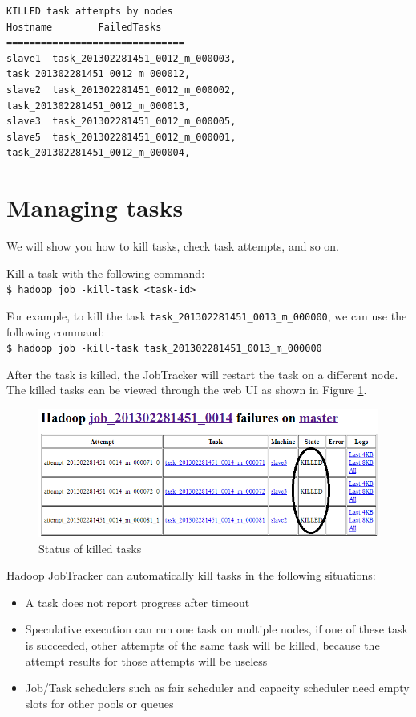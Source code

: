 \begin{lstlisting}
KILLED task attempts by nodes
Hostname        FailedTasks
===============================
slave1  task_201302281451_0012_m_000003, task_201302281451_0012_m_000012,
slave2  task_201302281451_0012_m_000002, task_201302281451_0012_m_000013,
slave3  task_201302281451_0012_m_000005,
slave5  task_201302281451_0012_m_000001, task_201302281451_0012_m_000004,
\end{lstlisting}

\section{Managing tasks}
We will show you how to kill tasks, check task attempts, and so on. 

Kill a task with the following command: \\
\verb|$ hadoop job -kill-task <task-id> |

For example, to kill the task \verb|task_201302281451_0013_m_000000|, we can use the following command: \\ 
\verb|$ hadoop job -kill-task task_201302281451_0013_m_000000|

After the task is killed, the JobTracker will restart the task on a different node. The killed tasks can be viewed through the web UI as shown in Figure \ref{fig:mapred.killed.tasks}.
\begin{figure}[ht]
  \centering
  \includegraphics[width=\textwidth]{figs/5163os_04_14.png}
  \caption{Status of killed tasks}\label{fig:mapred.killed.tasks}
\end{figure} 
Hadoop JobTracker can automatically kill tasks in the following situations:
\begin{itemize}
  \item A task does not report progress after timeout
  \item Speculative execution can run one task on multiple nodes, if one of these task is succeeded, other attempts of the same task will be killed, because the attempt results for those attempts will be useless
  \item Job/Task schedulers such as fair scheduler and capacity scheduler need empty slots for other pools or queues
\end{itemize}

